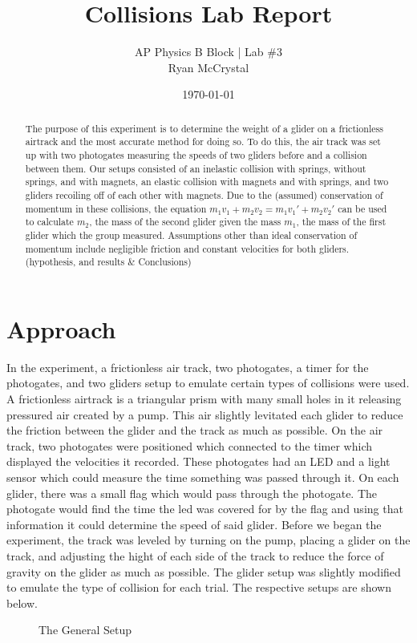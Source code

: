 \documentclass[12pt]{article}
\title{Collisions Lab Report}
\author{AP Physics B Block | Lab \#3\\Ryan McCrystal}
\date{\today}
\begin{document}
\maketitle
\newpage

\begin{abstract}
The purpose of this experiment is to determine the weight of a glider on a frictionless airtrack and the most accurate method for doing so. To do this, the air track was set up with two photogates measuring the speeds of two gliders before and a collision between them. Our setups consisted of an inelastic collision with springs, without springs, and with magnets, an elastic collision with magnets and with springs, and two gliders recoiling off of each other with magnets. Due to the (assumed) conservation of momentum in these collisions, the equation $m_1v_1+m_2v_2=m_1v_1'+m_2v_2'$ can be used to calculate $m_2$, the mass of the second glider given the mass $m_1$, the mass of the first glider which the group measured. Assumptions other than ideal conservation of momentum include negligible friction and constant velocities for both gliders. (hypothesis, and results \& Conclusions) %
\end{abstract}
\newpage

\section{Approach}

In the experiment, a frictionless air track, two photogates, a timer for the photogates, and two gliders setup to emulate certain types of collisions were used. A frictionless airtrack is a triangular prism with many small holes in it releasing pressured air created by a pump. This air slightly levitated each glider to reduce the friction between the glider and the track as much as possible. On the air track, two photogates were positioned which connected to the timer which displayed the velocities it recorded. These photogates had an LED and a light sensor which could measure the time something was passed through it. On each glider, there was a small flag which would pass through the photogate. The photogate would find the time the led was covered for by the flag and using that information it could determine the speed of said glider. Before we began the experiment, the track was leveled by turning on the pump, placing a glider on the track, and adjusting the hight of each side of the track to reduce the force of gravity on the glider as much as possible. The glider setup was slightly modified to emulate the type of collision for each trial. The respective setups are shown below.
\begin{figure}[H]
    \centering
    \caption{The General Setup}
\end{figure}
\end{document}
